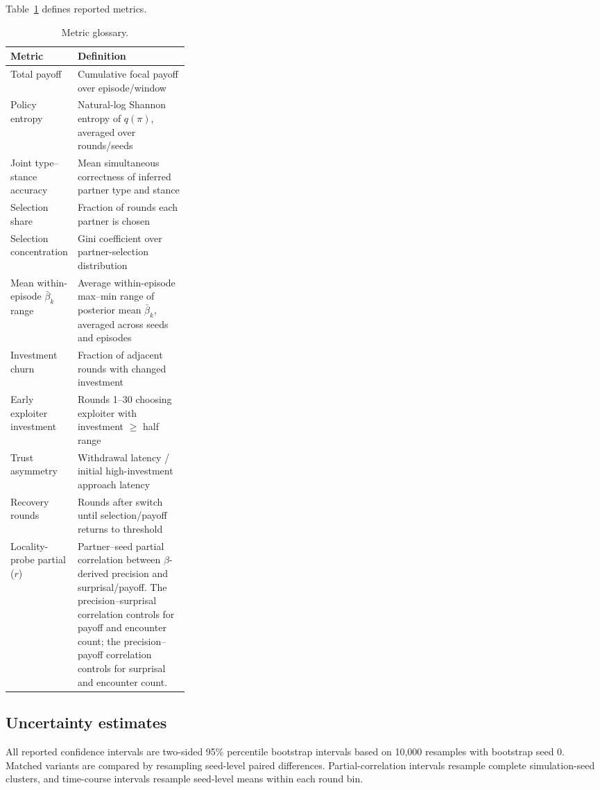 Table~\ref{tab:metrics_glossary} defines reported metrics.

\begin{table}[H]
\centering
\small
\caption{Metric glossary.}
\label{tab:metrics_glossary}
\begin{tabularx}{\linewidth}{@{}>{\raggedright\arraybackslash}p{0.30\linewidth}>{\raggedright\arraybackslash}X@{}}
\toprule
Metric & Definition \\
\midrule
Total payoff & Cumulative focal payoff over episode/window \\
Policy entropy & Natural-log Shannon entropy of $q(\pi)$, averaged over rounds/seeds \\
Joint type--stance accuracy & Mean simultaneous correctness of inferred partner type and stance \\
Selection share & Fraction of rounds each partner is chosen \\
Selection concentration & Gini coefficient over partner-selection distribution \\
Mean within-episode $\bar{\beta}_k$ range & Average within-episode max--min range of posterior mean $\bar{\beta}_k$, averaged across seeds and episodes \\
Investment churn & Fraction of adjacent rounds with changed investment \\
Early exploiter investment & Rounds 1--30 choosing exploiter with investment $\geq$ half range \\
Trust asymmetry & Withdrawal latency / initial high-investment approach latency \\
Recovery rounds & Rounds after switch until selection/payoff returns to threshold \\
Locality-probe partial (\(r\)) & Partner--seed partial correlation between $\beta$-derived precision and surprisal/payoff. The precision--surprisal correlation controls for payoff and encounter count; the precision--payoff correlation controls for surprisal and encounter count. \\
\bottomrule
\end{tabularx}
\end{table}

\subsection{Uncertainty estimates}

All reported confidence intervals are two-sided 95\% percentile bootstrap intervals based on 10,000 resamples with bootstrap seed 0. Matched variants are compared by resampling seed-level paired differences. Partial-correlation intervals resample complete simulation-seed clusters, and time-course intervals resample seed-level means within each round bin.
